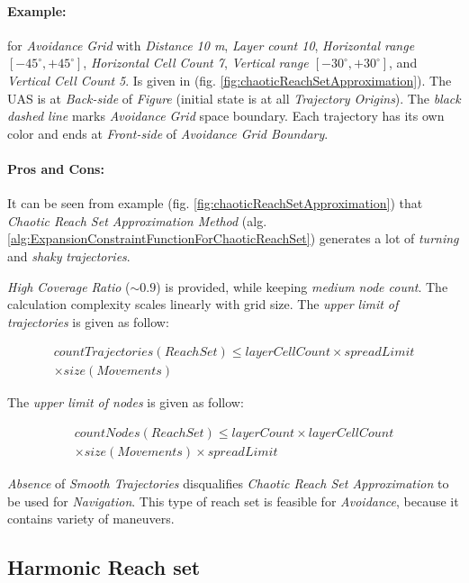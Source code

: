 \newpage
\paragraph{Example:} for \emph{Avoidance Grid} with \emph{Distance 10 m}, \emph{Layer count 10}, \emph{Horizontal range $[-45^\circ,+45^\circ]$}, \emph{Horizontal Cell Count 7}, \emph{Vertical range $[-30^\circ,+30^\circ]$}, and \emph{Vertical Cell Count 5}. Is given in (fig. \ref{fig:chaoticReachSetApproximation}). The UAS is at \emph{Back-side} of \emph{Figure} (initial state is at all \emph{Trajectory Origins}). The \emph{black dashed line} marks \emph{Avoidance Grid} space boundary. Each trajectory has its own color and ends at \emph{Front-side} of \emph{Avoidance Grid Boundary}.


\paragraph{Pros and Cons:} It can be seen from example (fig. \ref{fig:chaoticReachSetApproximation}) that \emph{Chaotic Reach Set Approximation Method} (alg. \ref{alg:ExpansionConstraintFunctionForChaoticReachSet}) generates a lot of \emph{turning} and \emph{shaky} \emph{trajectories}. 

\emph{High Coverage Ratio} ($\sim 0.9$) is provided, while keeping \emph{medium node count}. The calculation complexity scales linearly with grid size. The \emph{upper limit of trajectories} is given as follow:

\begin{multline}
    countTrajectories(ReachSet) \le layerCellCount \times spreadLimit\\ \times size(Movements)
\end{multline}

\noindent The \emph{upper limit of nodes} is given as follow:
    
\begin{multline}
    countNodes(ReachSet) \le layerCount \times  layerCellCount  \\
    \times size(Movements) \times spreadLimit  
\end{multline}

\noindent\emph{Absence} of \emph{Smooth Trajectories} disqualifies \emph{Chaotic Reach Set Approximation} to be used for \emph{Navigation}. This type of reach set is feasible for \emph{Avoidance}, because it contains variety of maneuvers.


\subsection{Harmonic Reach set}\label{s:harmonicReachSet}

